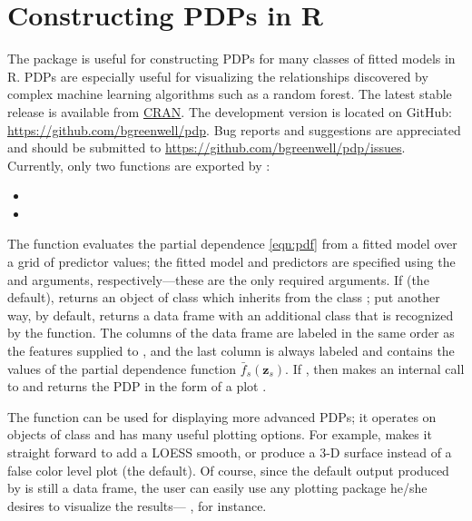 \section{Constructing PDPs in R}
\label{sec:boston}

The  package is useful for constructing PDPs for many classes of fitted models in R. PDPs are especially useful for visualizing the relationships discovered by complex machine learning algorithms such as a random forest. The latest stable release is available from \href{https://cran.r-project.org/package=pdp}{CRAN}. The development version is located on GitHub: \url{https://github.com/bgreenwell/pdp}. Bug reports and suggestions are appreciated and should be submitted to \url{https://github.com/bgreenwell/pdp/issues}. Currently, only two functions are exported by :
\begin{itemize}
  \item {}
  \item {}
\end{itemize}

The  function evaluates the partial dependence \eqref{eqn:pdf} from a fitted model over a grid of predictor values; the fitted model and predictors are specified using the  and  arguments, respectively---these are the only required arguments. If  (the default),  returns an object of class  which inherits from the class ; put another way, by default,  returns a data frame with an additional class that is recognized by the  function. The columns of the data frame are labeled in the same order as the features supplied to , and the last column is always labeled  and contains the values of the partial dependence function $\bar{f}_s\left(\boldsymbol{z}_s\right)$. If , then  makes an internal call to  and returns the PDP in the form of a  plot \citep{lattice-pkg}.

The  function can be used for displaying more advanced PDPs; it operates on objects of class  and has many useful plotting options. For example,  makes it straight forward to add a LOESS smooth, or produce a 3-D surface instead of a false color level plot (the default). Of course, since the default output produced by  is still a data frame, the user can easily use any plotting package he/she desires to visualize the results--- \citep{ggplot2-pkg}, for instance.

